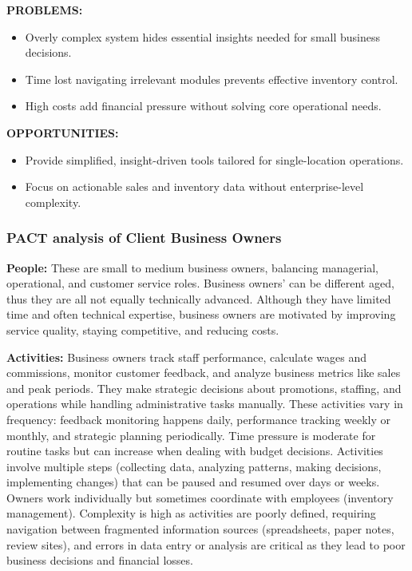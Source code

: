 \documentclass[]{VUMIFTemplateClass}
\begin{document}
\textbf{PROBLEMS:}
\begin{itemize}
    \item Overly complex system hides essential insights needed for small business decisions.
    \item Time lost navigating irrelevant modules prevents effective inventory control.
    \item High costs add financial pressure without solving core operational needs.
\end{itemize}

\textbf{OPPORTUNITIES:}
\begin{itemize}
    \item Provide simplified, insight-driven tools tailored for single-location operations.
    \item Focus on actionable sales and inventory data without enterprise-level complexity.
\end{itemize}

\subsubsection{PACT analysis of Client Business Owners}
    \textbf{People:} These are small to medium business owners, balancing
    managerial, operational, and customer service roles. Business owners’ can be
    different aged, thus they are all not equally technically advanced.
    Although they have limited time and often technical expertise, business
    owners are motivated by improving service quality, staying competitive, and
    reducing costs.

\textbf{Activities:} Business owners track staff performance, calculate wages
and commissions, monitor customer feedback, and analyze business metrics like
sales and peak periods. They make strategic decisions about promotions,
staffing, and operations while handling administrative tasks manually. These
activities vary in frequency: feedback monitoring happens daily, performance
tracking weekly or monthly, and strategic planning periodically. Time pressure
is moderate for routine tasks but can increase when dealing with budget
decisions. Activities involve multiple steps (collecting data, analyzing
patterns, making decisions, implementing changes) that can be paused and resumed
over days or weeks. Owners work individually but sometimes coordinate with
employees (inventory management). Complexity is high as activities are poorly
defined, requiring navigation between fragmented information sources
(spreadsheets, paper notes, review sites), and errors in data entry or analysis
are critical as they lead to poor business decisions and financial losses.
\end{document}
